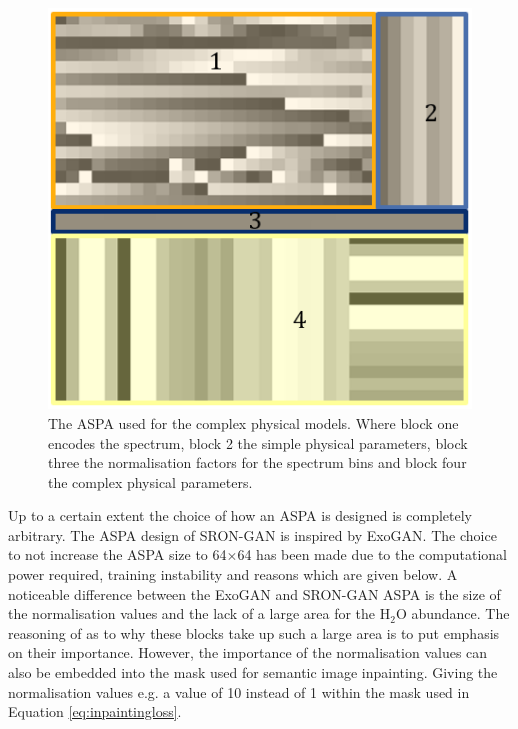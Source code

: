 \begin{figure} [!htb]
    \centering
    \includegraphics[scale=0.5]{figuren/srongan_aspa.png}
    \caption{The ASPA used for the complex physical models. Where block one encodes the spectrum, block 2 the simple physical parameters, block three the normalisation factors for the spectrum bins and block four the complex physical parameters.}
    \label{fig:srongan_aspa}
\end{figure}

Up to a certain extent the choice of how an ASPA is designed is completely arbitrary. The ASPA design of SRON-GAN is inspired by ExoGAN. The choice to not increase the ASPA size to 64$\times$64 has been made due to the computational power required, training instability and reasons which are given below. A noticeable difference between the ExoGAN and SRON-GAN ASPA is the size of the normalisation values and the lack of a large area for the $\mathrm{H_2O}$ abundance. 
The reasoning of \cite{zingales2018exogan} as to why these blocks take up such a large area is to put emphasis on their importance. However, the importance of the normalisation values can also be embedded into the mask used for semantic image inpainting. Giving the normalisation values e.g. a value of 10 instead of 1 within the mask used in Equation \ref{eq:inpaintingloss}.

